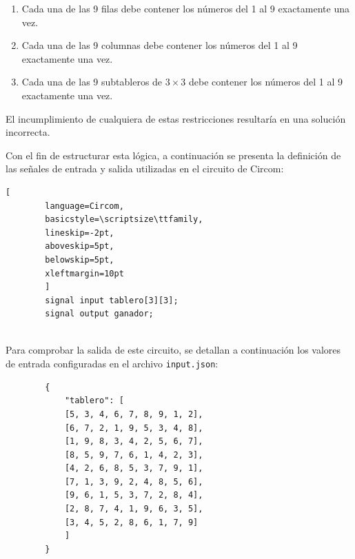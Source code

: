 \documentclass[a4paper,12pt]{report}
\begin{document}
	\begin{enumerate}
		\item Cada una de las 9 filas debe contener los números del 1 al 9 exactamente una vez.
		\item Cada una de las 9 columnas debe contener los números del 1 al 9 exactamente una vez.
		\item Cada una de las 9 subtableros de $3\times3$ debe contener los números del 1 al 9 exactamente una vez.
	\end{enumerate}
	
	\vspace{0.2cm}
	\noindent El incumplimiento de cualquiera de estas restricciones resultaría en una solución incorrecta.
	
	\vspace{0.2cm}
	\noindent Con el fin de estructurar esta lógica, a continuación se presenta la definición de las señales de entrada y salida utilizadas en el circuito de Circom:
	
	\vspace{0.2cm}
	\begin{lstlisting}[
		language=Circom,
		basicstyle=\scriptsize\ttfamily, 
		lineskip=-2pt,                  
		aboveskip=5pt,                  
		belowskip=5pt,                  
		xleftmargin=10pt
		]
		signal input tablero[3][3]; 
		signal output ganador; 
		
	\end{lstlisting}
	
	\vspace{0.4cm}
	\noindent Para comprobar la salida de este circuito, se detallan a continuación los valores de entrada configuradas en el archivo \texttt{input.json}:
	
	\begingroup
	
	\vspace{0.2cm}
	\begin{lstlisting}
		{
			"tablero": [
			[5, 3, 4, 6, 7, 8, 9, 1, 2],
			[6, 7, 2, 1, 9, 5, 3, 4, 8],
			[1, 9, 8, 3, 4, 2, 5, 6, 7],
			[8, 5, 9, 7, 6, 1, 4, 2, 3],
			[4, 2, 6, 8, 5, 3, 7, 9, 1],
			[7, 1, 3, 9, 2, 4, 8, 5, 6],
			[9, 6, 1, 5, 3, 7, 2, 8, 4],
			[2, 8, 7, 4, 1, 9, 6, 3, 5],
			[3, 4, 5, 2, 8, 6, 1, 7, 9]
			]
		}
	\end{lstlisting}
	
\end{document}

